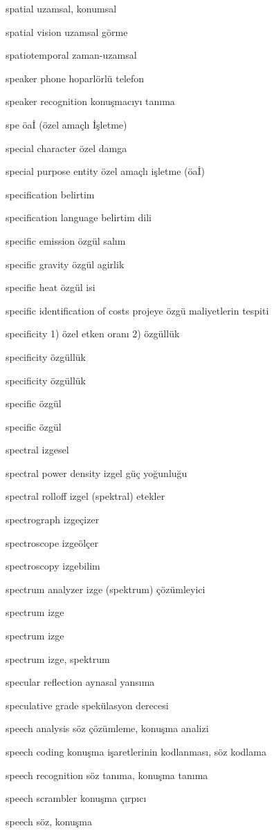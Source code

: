 \documentclass[12pt,fleqn]{article}\usepackage{../../common}
\begin{document}
spatial uzamsal, konumsal

spatial vision uzamsal görme

spatiotemporal zaman-uzamsal

speaker phone hoparlörlü telefon

speaker recognition konuşmacıyı tanıma

spe öaİ (özel amaçlı İşletme)

special character özel damga

special purpose entity özel amaçlı işletme (öaİ)

specification belirtim

specification language belirtim dili

specific emission özgül salım

specific gravity özgül agirlik

specific heat özgül isi

specific identification of costs projeye özgü maliyetlerin tespiti

specificity 1) özel etken oranı 2) özgüllük

specificity özgüllük

specificity özgüllük

specific özgül

specific özgül

spectral izgesel

spectral power density izgel güç yoğunluğu

spectral rolloff izgel (spektral) etekler

spectrograph izgeçizer

spectroscope izgeölçer

spectroscopy izgebilim

spectrum analyzer izge (spektrum) çözümleyici

spectrum izge

spectrum izge

spectrum izge, spektrum

specular reflection aynasal yansıma

speculative grade spekülasyon derecesi

speech analysis söz çözümleme, konuşma analizi

speech coding konuşma işaretlerinin kodlanması, söz kodlama

speech recognition söz tanıma, konuşma tanıma

speech scrambler konuşma çırpıcı

speech söz, konuşma
\end{document}
